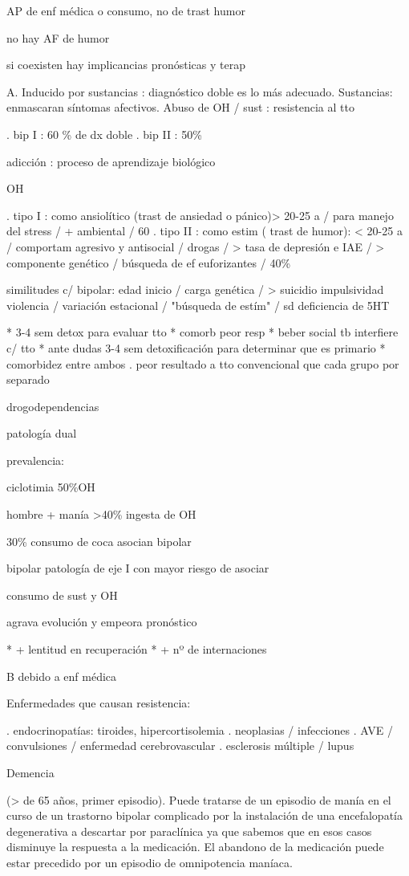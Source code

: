 \documentclass{scrbook}
\begin{document}
AP de enf médica o consumo, no de trast humor

no hay AF de humor

si coexisten hay implicancias pronósticas y terap

A. Inducido por sustancias : diagnóstico doble es lo más adecuado.
Sustancias: enmascaran síntomas afectivos.
Abuso de OH / sust : resistencia al tto

. bip I : 60 \% de dx doble
. bip II : 50\%

adicción : proceso de aprendizaje biológico

OH

. tipo I : como ansiolítico (trast de ansiedad o pánico)> 20-25 a / para manejo del stress / + ambiental / 60%
. tipo II : como estim ( trast de humor): < 20-25 a / comportam agresivo y antisocial / drogas / > tasa de depresión e IAE / > componente genético / búsqueda de ef euforizantes / 40\%

similitudes c/ bipolar: edad inicio / carga genética / > suicidio impulsividad violencia / variación estacional / "búsqueda de estím" / sd deficiencia de 5HT

* 3-4 sem detox para evaluar tto
* comorb peor resp
* beber social tb interfiere c/ tto
* ante dudas 3-4 sem detoxificación para determinar que es primario
* comorbidez entre ambos . peor resultado a tto convencional que cada grupo por separado

drogodependencias

patología dual

prevalencia:

ciclotimia 50\%OH

hombre + manía >40\% ingesta de OH

30\% consumo de coca asocian bipolar

bipolar patología de eje I con mayor riesgo de asociar

consumo de sust y OH

agrava evolución y empeora pronóstico

* + lentitud en recuperación
* + nº de internaciones

B debido a enf médica

Enfermedades que causan resistencia:

. endocrinopatías: tiroides, hipercortisolemia
. neoplasias / infecciones
. AVE / convulsiones / enfermedad cerebrovascular
. esclerosis múltiple / lupus

Demencia

(> de 65 años, primer episodio). Puede tratarse de un episodio de manía en el curso de un trastorno bipolar complicado por la instalación de una encefalopatía degenerativa a descartar por paraclínica ya que sabemos que en esos casos disminuye la respuesta a la medicación. El abandono de la medicación puede estar precedido por un episodio de omnipotencia maníaca.
\end{document}
